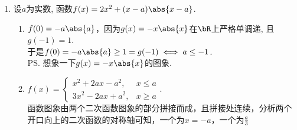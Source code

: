 \begin{enumerate}
\begin{jieda}
\begin{enumerate}
    \item 当$x>1$时, $y=\sqrt{\frac{x^2+1}{x^2-2x+1}}=\sqrt{1+\frac{2x}{x^2-2x+1}}=\sqrt{1+\frac{2}{x+\frac{1}{x}-2}}\in(1,+\infty)$. \\
    当$x<1$时, $y=-\sqrt{\frac{x^2+1}{x^2-2x+1}}=-\sqrt{1+\frac{2x}{x^2-2x+1}}$. \\
    再分为$(-\infty,0)\cup\{0\}\cup(0,1)$讨论可得$y\in(-\infty,-\frac{1}{\sqrt{2}}]$. \\
    综上, $y\in(-\infty,-\frac{1}{\sqrt{2}}]\cup(1,+\infty)$.
    \item $y = \sqrt{1+x} - \sqrt{2+x} = \frac{(\sqrt{1+x} + \sqrt{2+x})(\sqrt{1+x} - \sqrt{2+x})}{(\sqrt{1+x} + \sqrt{2+x})} = \frac{-1}{(\sqrt{1+x} + \sqrt{2+x})}$ \\
    易知函数在定义域$[-1, +\infty)$内单调递增，最小值在左端点$x = -1$取$y = -1$，当$x$趋于无穷时，函数值趋于0。因此值域为$[-1, 0)$
    \item $y = \sqrt{1+x} + \sqrt{2-x}$，故$y^2 = (1+x) + (2-x) + 2\sqrt{(1+x)(2-x)}  = 3 + 2\sqrt{(1+x)(2-x)} \in [3, 6]$，故$y \in [\sqrt{3}, \sqrt{6}]$
    \end{enumerate}
    \end{jieda}
    \begin{vspace_}
    \vsp[6]
    \end{vspace_}
    \item 设$a$为实数, 函数$f(x)=2x^2+(x-a)\abs{x-a}$. \\
    \begin{jieda}
    \begin{enumerate}[1.]
    \item $f(0)=-a\abs{a}$，因为$g(x)=-x\abs{x}$在$\bR$上严格单调递, 且$g(-1)=1$. \\
    于是$f(0)=-a\abs{a}\geq 1=g(-1)\iff a\leq -1$.  \\
    \ps 想象一下$g(x)=-x\abs{x}$的图象.
    \item $f(x)=\begin{cases}
    x^2+2ax-a^2, & x\leq a\\
    3x^2-2ax+a^2, & x\geq a
    \end{cases}$. \\
    函数图象由两个二次函数图象的部分拼接而成，且拼接处连续，分析两个开口向上的二次函数的对称轴可知，一个为$x = -a$，一个为$\frac{a}{3}$ \\

\end{enumerate}
\end{jieda}
\end{enumerate}
